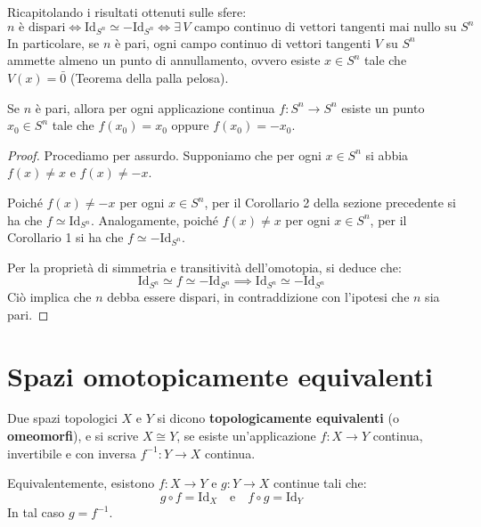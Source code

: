 \begin{observacion}
Ricapitolando i risultati ottenuti sulle sfere:
\[
n \text{ è dispari} \iff \mathrm{Id}_{S^n} \simeq -\mathrm{Id}_{S^n} \iff \exists\, V \text{ campo continuo di vettori tangenti mai nullo su } S^n
\]
In particolare, se $n$ è pari, ogni campo continuo di vettori tangenti $V$ su $S^n$ ammette almeno un punto di annullamento, ovvero esiste $x \in S^n$ tale che $V(x) = \bar{0}$ (Teorema della palla pelosa).
\end{observacion}

\vspace{1.5em}

\begin{prop}
Se $n$ è pari, allora per ogni applicazione continua $f: S^n \to S^n$ esiste un punto $x_0 \in S^n$ tale che $f(x_0) = x_0$ oppure $f(x_0) = -x_0$.
\end{prop}


\begin{proof}
Procediamo per assurdo. Supponiamo che per ogni $x \in S^n$ si abbia $f(x) \neq x$ e $f(x) \neq -x$.

Poiché $f(x) \neq -x$ per ogni $x \in S^n$, per il Corollario 2 della sezione precedente si ha che $f \simeq \mathrm{Id}_{S^n}$.
Analogamente, poiché $f(x) \neq x$ per ogni $x \in S^n$, per il Corollario 1 si ha che $f \simeq -\mathrm{Id}_{S^n}$.

Per la proprietà di simmetria e transitività dell'omotopia, si deduce che:
\[
\mathrm{Id}_{S^n} \simeq f \simeq -\mathrm{Id}_{S^n} \implies \mathrm{Id}_{S^n} \simeq -\mathrm{Id}_{S^n}
\]
Ciò implica che $n$ debba essere dispari, in contraddizione con l'ipotesi che $n$ sia pari.
\end{proof}

\vspace{2em}

\section{Spazi omotopicamente equivalenti}

\begin{definicion}
Due spazi topologici $X$ e $Y$ si dicono \textbf{topologicamente equivalenti} (o \textbf{omeomorfi}), e si scrive $X \cong Y$, se esiste un'applicazione $f: X \to Y$ continua, invertibile e con inversa $f^{-1}: Y \to X$ continua.

Equivalentemente, esistono $f: X \to Y$ e $g: Y \to X$ continue tali che:
\[
g \circ f = \mathrm{Id}_X \quad \text{e} \quad f \circ g = \mathrm{Id}_Y
\]
In tal caso $g = f^{-1}$.
\end{definicion}

